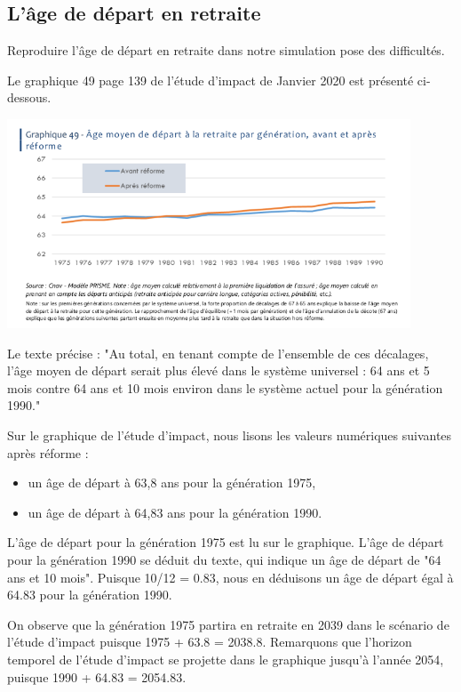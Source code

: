 \documentclass[10pt]{article}
\begin{document}

\subsection{L'âge de départ en retraite}

Reproduire l'âge de départ en retraite dans notre simulation 
pose des difficultés. 

Le graphique 49 page 139 de l'étude d'impact de Janvier 2020 est présenté ci-dessous.

\begin{center}
\includegraphics[width=0.9\textwidth]{EtudeImpact-AgeDepartRetraite.png}
\end{center}

Le texte précise : "Au total, en tenant compte de l’ensemble de ces 
décalages, l’âge moyen de départ serait plus élevé dans le système 
universel : 64 ans et 5 mois contre 64 ans et 10 mois environ dans 
le système actuel pour la génération 1990."

Sur le graphique de l'étude d'impact, nous lisons les valeurs numériques suivantes après réforme :
\begin{itemize}
\item un âge de départ à 63,8 ans pour la génération 1975,
\item un âge de départ à 64,83 ans pour la génération 1990.
\end{itemize}

L'âge de départ pour la génération 1975 est lu sur le graphique. 
L'âge de départ pour la génération 1990 se déduit du texte, qui 
indique un âge de départ de "64 ans et 10 mois". 
Puisque 10/12 = 0.83, nous en déduisons un âge de départ égal à 64.83 pour 
la génération 1990. 

On observe que la génération 1975 partira en retraite en 2039 dans le scénario de l'étude d'impact puisque 1975 + 63.8 = 2038.8.
Remarquons que l'horizon temporel de l'étude d'impact se projette dans le graphique jusqu'à l'année 2054, puisque 1990 + 64.83 = 2054.83. 
\end{document}
